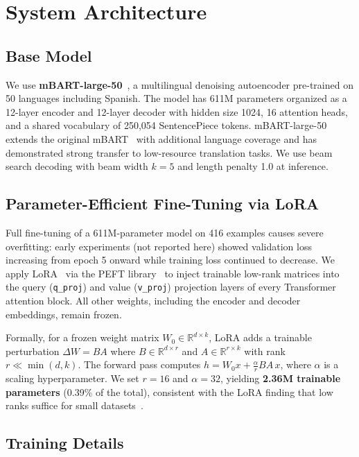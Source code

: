 \documentclass[sigconf,screen]{ceurart}
\begin{document}
\section{System Architecture}
\label{sec:system}

\subsection{Base Model}

We use \textbf{mBART-large-50}~\cite{tang2020mbart50}, a multilingual
denoising autoencoder pre-trained on 50 languages including Spanish.
The model has 611M parameters organized as a 12-layer encoder and
12-layer decoder with hidden size 1024, 16 attention heads, and a
shared vocabulary of 250,054 SentencePiece tokens.
mBART-large-50 extends the original mBART~\cite{liu2020mbart} with
additional language coverage and has demonstrated strong transfer to
low-resource translation tasks.
We use beam search decoding with beam width $k = 5$ and length
penalty 1.0 at inference.

\subsection{Parameter-Efficient Fine-Tuning via LoRA}

Full fine-tuning of a 611M-parameter model on 416 examples causes
severe overfitting: early experiments (not reported here) showed
validation loss increasing from epoch 5 onward while training loss
continued to decrease.
We apply LoRA~\cite{hu2022lora} via the PEFT
library~\cite{mangrulkar2022peft} to inject trainable low-rank
matrices into the query (\texttt{q\_proj}) and value (\texttt{v\_proj})
projection layers of every Transformer attention block.
All other weights, including the encoder and decoder embeddings, remain
frozen.

Formally, for a frozen weight matrix $W_0 \in \mathbb{R}^{d \times k}$,
LoRA adds a trainable perturbation $\Delta W = BA$ where
$B \in \mathbb{R}^{d \times r}$ and $A \in \mathbb{R}^{r \times k}$
with rank $r \ll \min(d, k)$.
The forward pass computes $h = W_0 x + \frac{\alpha}{r} BA\, x$,
where $\alpha$ is a scaling hyperparameter.
We set $r = 16$ and $\alpha = 32$, yielding
\textbf{2.36M trainable parameters} (0.39\% of the total),
consistent with the LoRA finding that low ranks suffice for small
datasets~\cite{hu2022lora}.

\subsection{Training Details}
\end{document}
